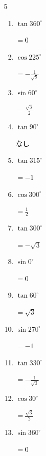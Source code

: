 \begin{multicols}{5}
\begin{enumerate}
  \item $\displaystyle \tan{360^\circ}$

        $\displaystyle =0$

  \item $\displaystyle \cos{225^\circ}$

        $\displaystyle =-\frac{1}{\sqrt{2}}$

  \item $\displaystyle \sin{60^\circ}$

        $\displaystyle =\frac{\sqrt{3}}{2}$

  \item $\displaystyle \tan{90^\circ}$

        $\displaystyle なし$

  \item $\displaystyle \tan{315^\circ}$

        $\displaystyle =-1$

\columnbreak %

  \item $\displaystyle \cos{300^\circ}$

        $\displaystyle =\frac{1}{2}$

  \item $\displaystyle \tan{300^\circ}$

        $\displaystyle =-\sqrt{3}$

  \item $\displaystyle \sin{0^\circ}$

        $\displaystyle =0$

  \item $\displaystyle \tan{60^\circ}$

        $\displaystyle =\sqrt{3}$

  \item $\displaystyle \sin{270^\circ}$

        $\displaystyle =-1$

  \item $\displaystyle \tan{330^\circ}$

        $\displaystyle =-\frac{1}{\sqrt{3}}$

  \item $\displaystyle \cos{30^\circ}$

        $\displaystyle =\frac{\sqrt{3}}{2}$

  \item $\displaystyle \sin{360^\circ}$

        $\displaystyle =0$


\end{enumerate}
\end{multicols}
